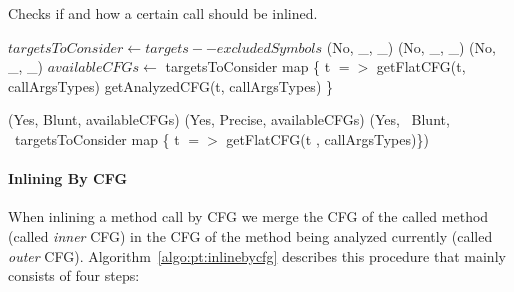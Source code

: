 \documentclass[a4paper]{article}
\begin{document}
\begin{algorithm}
\caption{Checks if and how a certain call should be inlined.}\label{algo:pt:shouldwe}
\begin{algorithmic}[1]
    \State $targetsToConsider \gets targets -- excludedSymbols$
            \State \Return (No, \_, \_)
            \State \Return (No, \_, \_)
            \State \Return (No, \_, \_)
        \Else
            \State $availableCFGs \gets$ targetsToConsider map \{ t $=>$
                \State getFlatCFG(t, callArgsTypes)
            \Else
                \State getAnalyzedCFG(t, callArgsTypes)
            \EndIf
            \State \}

                \State \Return (Yes, Blunt, availableCFGs)
            \Else
                \State \Return (Yes, Precise, availableCFGs)
            \EndIf
        \EndIf
    \Else
        \State \Return (Yes, ~Blunt, ~targetsToConsider map \{ t $=>$ getFlatCFG(t , callArgsTypes)\})
    \EndIf
\EndFunction
\end{algorithmic}
\end{algorithm}


\paragraph{Inlining By CFG}
When inlining a method call by CFG we merge the CFG of the called method
(called \emph{inner} CFG) in the CFG of the method being analyzed currently (called
\emph{outer} CFG). Algorithm~\ref{algo:pt:inlinebycfg} describes this procedure that
mainly consists of four steps:
\end{document}
